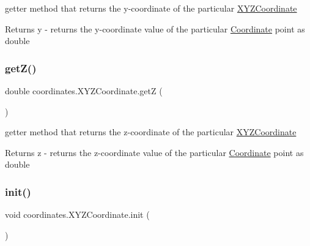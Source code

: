 getter method that returns the y-\/coordinate of the particular \hyperlink{classcoordinates_1_1_x_y_z_coordinate}{X\+Y\+Z\+Coordinate} 

\begin{DoxyReturn}{Returns}
y -\/ returns the y-\/coordinate value of the particular \hyperlink{classcoordinates_1_1_coordinate}{Coordinate} point as double 
\end{DoxyReturn}
\mbox{\label{classcoordinates_1_1_x_y_z_coordinate_a1273b99ae80abff51a75b6ced7f3e10f}} 
\subsubsection{\texorpdfstring{get\+Z()}{getZ()}}
{\footnotesize\ttfamily double coordinates.\+X\+Y\+Z\+Coordinate.\+getZ (\begin{DoxyParamCaption}{ }\end{DoxyParamCaption})}



getter method that returns the z-\/coordinate of the particular \hyperlink{classcoordinates_1_1_x_y_z_coordinate}{X\+Y\+Z\+Coordinate} 

\begin{DoxyReturn}{Returns}
z -\/ returns the z-\/coordinate value of the particular \hyperlink{classcoordinates_1_1_coordinate}{Coordinate} point as double 
\end{DoxyReturn}
\mbox{\label{classcoordinates_1_1_x_y_z_coordinate_a88847e65ce05894be77bd2735d15a4ca}} 
\subsubsection{\texorpdfstring{init()}{init()}}
{\footnotesize\ttfamily void coordinates.\+X\+Y\+Z\+Coordinate.\+init (\begin{DoxyParamCaption}{ }\end{DoxyParamCaption})}

\mbox{\label{classcoordinates_1_1_x_y_z_coordinate_a4ff7f1c0dee75f3c60dc735c26129761}} 
